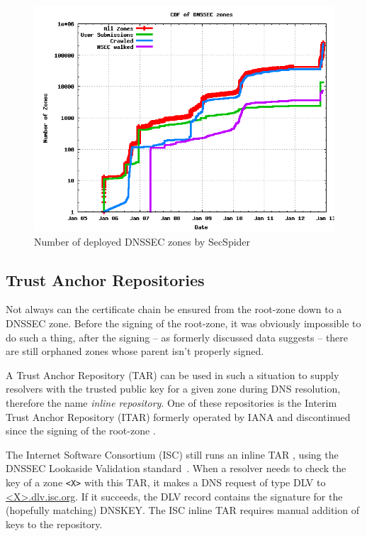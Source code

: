 \documentclass[a4paper,twocolumn]{scrartcl}
\begin{document}
\begin{figure}
  \includegraphics[width=\linewidth]{dnssec-growth}
  \caption{Number of deployed DNSSEC zones by
    SecSpider \cite{secspider}}
  \label{fig:dnssec-growth}
\end{figure}

\subsection{Trust Anchor Repositories}
Not always can the certificate chain be ensured from the root-zone
down to a DNSSEC zone. Before the signing of the root-zone, it was
obviously impossible to do such a thing, after the signing -- as
formerly discussed data suggests -- there are still orphaned zones
whose parent isn't properly signed.

A Trust Anchor Repository (TAR) can be used in such a situation to
supply resolvers with the trusted public key for a given zone during
DNS resolution, therefore the name \emph{inline repository}. One of
these repositories is the Interim Trust Anchor Repository (ITAR)
formerly operated by IANA and discontinued since the signing of the
root-zone \cite{itar}.

The Internet Software Consortium (ISC) still runs an inline TAR
\cite{iscDlv}, using the DNSSEC Lookaside Validation standard~\cite{RFC5074}. When a resolver needs to check the key of a zone
\verb|<X>| with this TAR, it makes a DNS request of type DLV to 
\url{<X>.dlv.isc.org}. If it succeeds, the DLV record contains the
signature for the (hopefully matching) DNSKEY. The ISC inline TAR
requires manual addition of keys to the repository.
\end{document}
